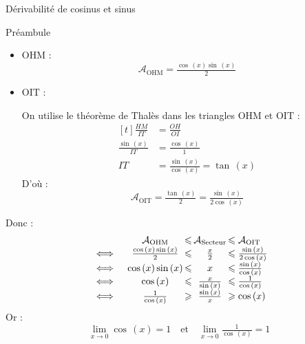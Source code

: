 \documentclass{cours}
\let\frac\tfrac %
\begin{document}
\begin{Gpartie}{Dérivabilité de cosinus et sinus}
\begin{Spartie}{Préambule}
\begin{itemize}
                \item $\mathrm{OHM}$ : \[\mathcal{A}_\mathrm{OHM}=\frac{\cos\,(x)\sin\,(x)}{2}\]

                \item $\mathrm{OIT}$ :
                
                On utilise le théorème de Thalès dans les triangles $\mathrm{OHM}$ et $\mathrm{OIT}$ : 
                \[\begin{aligned}[t]
                    \frac{HM}{IT} &= \frac{OH}{OI} \\[1.5ex]
                    \frac{\sin\,(x)}{IT} &=\frac{\cos\,(x)}{1} \\[1.5ex]
                    IT &= \frac{\sin\,(x)}{\cos\,(x)}=\tan\,(x)
                \end{aligned}\]
                D'où :  \[\mathcal{A}_\mathrm{OIT}=\frac{\tan\,(x)}{2}=\frac{\sin\,(x)}{2\cos\,(x)}\]
            \end{itemize}
        
            \renewcommand*{\arraystretch}{2} %

            Donc :~
            \[\begin{array}{ r@{\,} c@{\,} c@{\,} c@{\,} l@{\,} }
                    &\quad\mathcal{A}_\mathrm{OHM}  & \leq & \mathcal{A}_\text{Secteur} & \leq\mathcal{A}_\mathrm{OIT} \\
                \iff&\quad\frac{\cos\,(x)\sin\,(x)}{2}  & \leq & \frac{x}{2}                & \leq\frac{\sin\,(x)}{2\cos\,(x)} \\
                \iff&\quad\cos\,(x)\sin\,(x)            & \leq & x                          & \leq\frac{\sin\,(x)}{\cos\,(x)} \\
                \iff&\quad\cos\,(x)                   & \leq & \frac{x}{\sin\,(x)}          & \leq\frac{1}{\cos\,(x)} \\
                \iff&\quad\frac{1}{\cos\,(x)}         & \geq & \frac{\sin\,(x)}{x}          & \geq\cos\,(x) 
            \end{array}\]
            Or : \[\lim\limits_{x\to0}\cos\,(x)=1\quad\text{et}\quad\lim\limits_{x\to0}\frac{1}{\cos\,(x)}=1\]


\end{Spartie}
\end{Gpartie}
\end{document}
